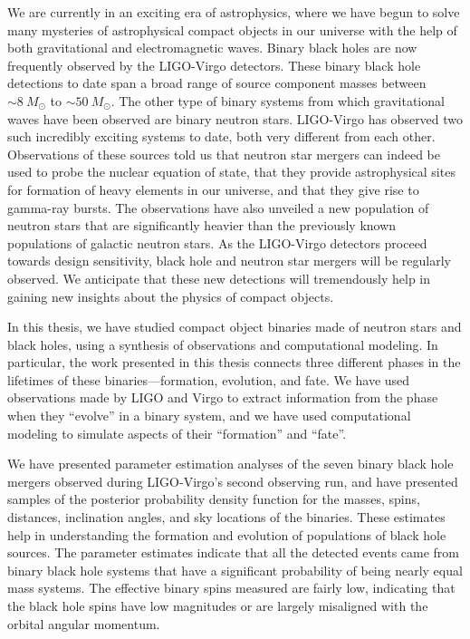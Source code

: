 We are currently in an exciting era of astrophysics, where we have begun to solve many mysteries of astrophysical compact objects in our universe with the help of both gravitational and electromagnetic waves. Binary black holes are now frequently observed by the LIGO-Virgo detectors. These binary black hole detections to date span a broad range of source component masses between $\sim 8~M_\odot$ to $\sim 50~M_\odot$. The other type of binary systems from which gravitational waves have been observed are binary neutron stars. LIGO-Virgo has observed two such incredibly exciting systems to date, both very different from each other. Observations of these sources told us that neutron star mergers can indeed be used to probe the nuclear equation of state, that they provide astrophysical sites for formation of heavy elements in our universe, and that they give rise to gamma-ray bursts. The observations have also unveiled a new population of neutron stars that are significantly heavier than the previously known populations of galactic neutron stars. As the LIGO-Virgo detectors proceed towards design sensitivity, black hole and neutron star mergers will be regularly observed. We anticipate that these new detections will tremendously help in gaining new insights about the physics of compact objects.

In this thesis, we have studied compact object binaries made of neutron stars and black holes, using a synthesis of observations and computational modeling. In particular, the work presented in this thesis connects three different phases in the lifetimes of these binaries---formation, evolution, and fate. We have used observations made by LIGO and Virgo to extract information from the phase when they ``evolve'' in a binary system, and we have used computational modeling to simulate aspects of their ``formation'' and ``fate''.

We have presented parameter estimation analyses of the seven binary black hole mergers observed during LIGO-Virgo's second observing run, and have presented samples of the posterior probability density function for the masses, spins, distances, inclination angles, and sky locations of the binaries. These estimates help in understanding the formation and evolution of populations of black hole sources. The parameter estimates indicate that all the detected events came from binary black hole systems that have a significant probability of being nearly equal mass systems. The effective binary spins measured are fairly low, indicating that the black hole spins have low magnitudes or are largely misaligned with the orbital angular momentum.


